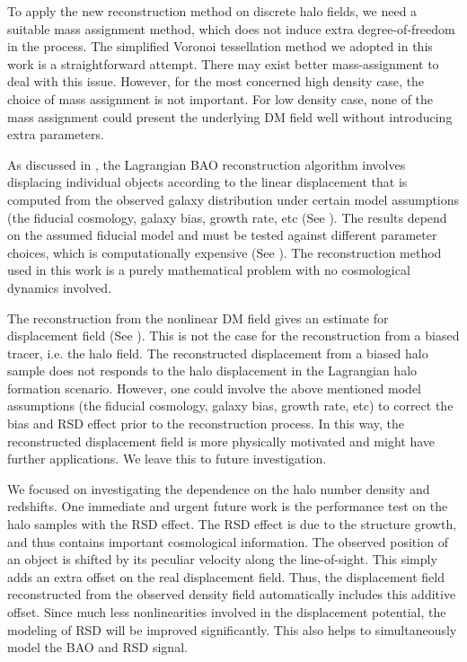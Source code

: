 \documentclass[iop]{emulateapj}
\begin{document}
{To apply the new reconstruction method on discrete halo fields,
we need a suitable mass assignment method, which does not induce extra degree-of-freedom in the process.
The simplified Voronoi tessellation method we adopted in this work is a straightforward attempt.
There may exist better mass-assignment to deal with this issue.
However, for the most concerned high density case, the choice of mass assignment is not important.
For low density case, none of the mass assignment could present the underlying DM field well without introducing extra parameters.

As discussed in \cite{zhuhm16c},
the Lagrangian BAO reconstruction algorithm involves displacing individual objects according to the linear displacement that is computed from the observed galaxy distribution under certain model assumptions (the fiducial cosmology, galaxy bias, growth rate, etc (See \cite{Eisenstein07,Schmittfull15}). The results depend on the assumed fiducial model and must be tested against different parameter choices, which is computationally expensive (See \cite{Padmanabhan12}). The reconstruction method used in this work is a purely mathematical problem with no cosmological dynamics involved. 

The reconstruction from the nonlinear DM field gives an estimate for displacement field (See \cite{zhuhm16c}).
This is not the case for the reconstruction from a biased tracer, i.e. the halo field.
The reconstructed displacement from a biased halo sample does not responds to the halo displacement in the Lagrangian halo formation scenario.
However, one could involve the above mentioned model assumptions (the fiducial cosmology, galaxy bias, growth rate, etc) to correct the bias and RSD effect prior to the reconstruction process.
In this way, the reconstructed displacement field is more physically motivated and might have further applications.
We leave this to future investigation.

We focused on investigating the dependence on the halo number density and redshifts.
One immediate and urgent future work is the performance test on the halo samples with the RSD effect.
The RSD effect is due to the structure growth, and thus contains important cosmological information.
The observed position of an object is shifted by its peculiar velocity along the line-of-sight.
This simply adds an extra offset on the real displacement field. 
Thus, the displacement field reconstructed from the observed density field automatically includes this additive offset. 
Since much less nonlinearities involved in the displacement potential, the modeling of RSD will be improved significantly.
This also helps to simultaneously model the BAO and RSD signal.

}
\end{document}
